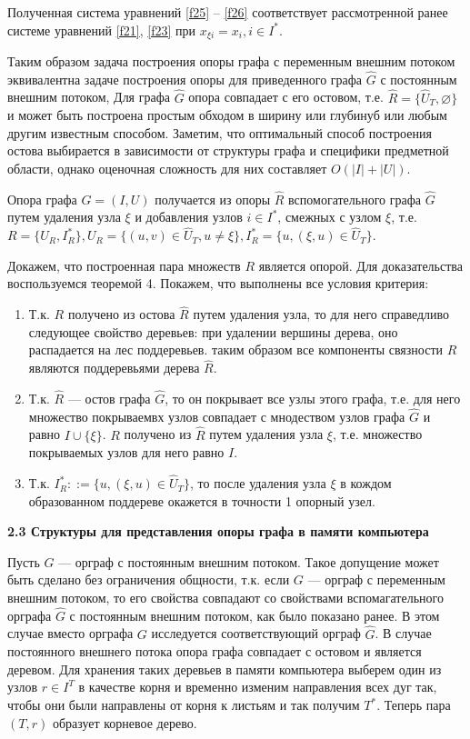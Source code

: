 \documentclass[14pt]{extarticle}%
\begin{document}
Полученная система уравнений \eqref{f25} -- \eqref{f26} соответствует рассмотренной ранее системе уравнений \eqref{f21}, \eqref{f23} при $x_{\xi i}=x_i, i\in I^*$.

Таким образом задача построения опоры графа с переменным внешним потоком эквивалентна задаче построения опоры для приведенного графа $\widehat{G}$ с постоянным внешним потоком, Для графа $\widehat{G}$ опора совпадает с его остовом, т.е. $\widehat{R}=\{\widehat{U}_T,\varnothing\}$ и может быть построена простым обходом в ширину или глубинуб или любым другим известным способом. Заметим, что оптимальный способ построения остова выбирается в зависимости от структуры графа и специфики предметной области, однако оценочная сложность для них составляет $O(|I|+|U|)$.

Опора графа $G=(I,U)$ получается из опоры $\widehat{R}$ вспомогательного графа $\widehat{G}$ путем удаления узла $\xi$ и добавления узлов $i\in I^*$, смежных с узлом $\xi$, т.е. $R=\{U_R, I^*_R\}, U_R=\{(u,v)\in \widehat{U}_T,u\neq \xi\}, I^*_R=\{u,(\xi,u)\in \widehat{U}_T\}$.

Докажем, что построенная пара множеств $R$ является опорой. Для доказательства воспользуемся теоремой 4. Покажем, что выполнены все условия критерия:
\begin{enumerate}
 \item Т.к. $R$ получено из остова $\widehat{R}$ путем удаления узла, то для него справедливо следующее свойство деревьев: при удалении вершины дерева, оно распадается на лес поддеревьев. таким образом все компоненты связности $R$ являются поддеревьями дерева $\widehat{R}$.
 \item Т.к. $\widehat{R}$ --- остов графа $\widehat{G}$, то он покрывает все узлы этого графа, т.е. для него множество покрываемвх узлов совпадает с мнодеством узлов графа $\widehat{G}$ и равно $I\cup \{\xi\}$. $R$ получено из $\widehat{R}$ путем удаления узла $\xi$, т.е. множество покрываемых узлов для него равно $I$.
 \item Т.к. $I^*_R::=\{u,(\xi,u)\in \widehat{U}_T\}$, то после удаления узла $\xi$ в кождом образованном поддереве окажется в точности 1 опорный узел.
 \end{enumerate}

\textbf{2.3 Структуры для представления опоры графа в памяти компьютера}

Пусть $G$ --- орграф с постоянным внешним потоком. Такое допущение может быть сделано без ограничения общности, т.к. если $G$ --- орграф с переменным внешним потоком, то его свойства совпадают со свойствами вспомагательного орграфа $\widehat{G}$ с постоянным внешним потоком, как было показано ранее. В этом случае вместо орграфа $G$ исследуется соответствующий орграф $\widehat{G}$. В случае постоянного внешнего потока опора графа совпадает с остовом и является деревом. Для хранения таких деревьев в памяти компьютера выберем один из узлов $r\in I^T$ в качестве корня и временно изменим направления всех дуг так, чтобы они были направлены от корня к листьям и так получим $T^*$. Теперь пара $(T,r)$ образует корневое дерево.
\end{document}
